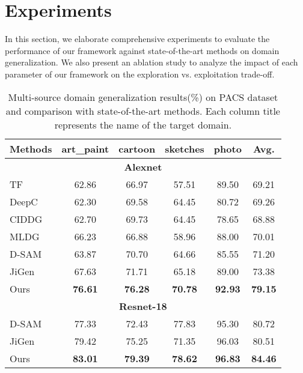 \documentclass[10pt,twocolumn,letterpaper]{article}
\begin{document}
 \section{Experiments}
In this section, we elaborate comprehensive experiments to evaluate the performance of our framework against state-of-the-art methods on domain generalization. We also present an ablation study to analyze the impact of each parameter of our framework on the exploration vs. exploitation trade-off.

\begin{table}[t!]
	\begin{center}
		\tabcolsep=0.15cm
		\begin{tabular}{l|c c c c|c}
			\hline
			\hline
			Methods&art\_paint&cartoon&sketches&photo&Avg.\\
			\hline
			\multicolumn{6}{c}{\textbf{Alexnet}}\\
			\hline
			TF\cite{li2017deeper}&62.86&66.97&57.51&89.50&69.21\\
			DeepC\cite{li2018deep}&62.30&69.58&64.45&80.72&69.26\\
			CIDDG\cite{li2018deep}&62.70&69.73&64.45&78.65&68.88\\
			MLDG\cite{li2018learning}&66.23&66.88&58.96&88.00&70.01\\
			D-SAM\cite{d2018domain}&63.87&70.70&64.66&85.55&71.20\\
			JiGen\cite{carlucci2019domain}&67.63&71.71&65.18&89.00&73.38\\
			Ours&\textbf{76.61}&\textbf{76.28}&\textbf{70.78}&\textbf{92.93}&\textbf{79.15}\\
			\hline
			\multicolumn{6}{c}{\textbf{Resnet-18}}\\
			\hline
			D-SAM\cite{d2018domain}&77.33&72.43&77.83&95.30&80.72\\
			JiGen\cite{carlucci2019domain}&79.42&75.25&71.35&96.03&80.51\\
			Ours&\textbf{83.01}&\textbf{79.39}&\textbf{78.62}&\textbf{96.83}&\textbf{84.46}\\
			\hline\hline
		\end{tabular}
	\end{center}
	\caption{Multi-source domain generalization results(\%) on PACS dataset\cite{li2017deeper} and comparison with state-of-the-art methods. Each column title represents the name of the target domain.}
	\label{table1}
\end{table}
\end{document}

